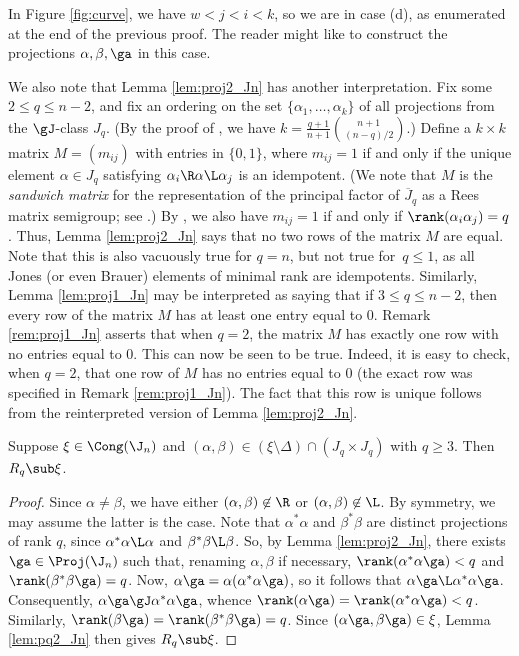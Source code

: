 %
\begin{rem}
In Figure \ref{fig:curve}, we have $w<j<i<k$, so we are in case (d), as enumerated at the end of the previous proof.  The reader might like to construct the projections $\alpha,\beta,\ga$ in this case.
\end{rem}


\begin{rem}\label{rem:proj2_Jn}
We also note that Lemma \ref{lem:proj2_Jn} has another interpretation.
%
Fix some $2\leq q\leq n-2$, and fix an ordering on the set $\{\alpha_1,\ldots,\alpha_k\}$ of all projections from the $\gJ$-class $J_q$.  (By the proof of \cite[Theorem~9.5]{EG2017}, we have $k=\frac{q+1}{n+1}\binom{n+1}{(n-q)/2}$.)  Define a $k\times k$ matrix $M=(m_{ij})$ with entries in $\{0,1\}$, where $m_{ij}=1$ if and only if
the unique element $\alpha\in J_q$ satisfying $\alpha_i\R\alpha\L\alpha_j$ is an idempotent.
(We note that $M$ is the \emph{sandwich matrix} for the representation of the principal factor of $\overline{J}_q$ as a Rees matrix semigroup; see \cite[Section 3.2]{Howie}.)
By \cite[Lemma 2.3(ii)]{emojoka}, we also have $m_{ij}=1$ if and only if $\rank(\alpha_i\alpha_j)=q$.  Thus, Lemma \ref{lem:proj2_Jn} says that no two rows of the matrix $M$ are equal.  Note that this is also vacuously true for $q=n$, but not true for~$q\leq1$, as all Jones (or even Brauer) elements of minimal rank are idempotents.  Similarly, Lemma \ref{lem:proj1_Jn} may be interpreted as saying that if $3\leq q\leq n-2$, then every row of the matrix $M$ has at least one entry equal to $0$.  Remark \ref{rem:proj1_Jn} asserts that when $q=2$, the matrix $M$ has exactly one row with no entries equal to $0$.  This can now be seen to be true.  Indeed, it is easy to check, when $q=2$, that one row of $M$ has no entries equal to $0$ (the exact row was specified in Remark \ref{rem:proj1_Jn}).  The fact that this row is unique follows from the reinterpreted version of Lemma \ref{lem:proj2_Jn}.
\end{rem}




\begin{lemma}\label{lem:qq_Jn}
Suppose $\xi\in\Cong(\J_n)$ and $(\alpha,\beta)\in (\xi\setminus\Delta)\cap (J_q\times J_q)$ with $q\geq3$.  Then $R_q\sub\xi$.
\end{lemma}


\begin{proof} Since $\alpha\not=\beta$, we have either $(\alpha,\beta)\not\in{\R}$ or $(\alpha,\beta)\not\in{\L}$.  By symmetry, we may assume the latter is the case.  Note that $\alpha^*\alpha$ and $\beta^*\beta$ are distinct projections of rank $q$, since $\alpha^*\alpha\L\alpha$ and $\beta^*\beta\L\beta$.  So, by Lemma \ref{lem:proj2_Jn}, there exists $\ga\in\Proj(\J_n)$ such that, renaming $\alpha,\beta$ if necessary, $\rank(\alpha^*\alpha\ga)<q$ and $\rank(\beta^*\beta\ga)=q$.  Now, $\alpha\ga=\alpha(\alpha^*\alpha\ga)$, so it follows that $\alpha\ga\L\alpha^*\alpha\ga$.  Consequently, $\alpha\ga\gJ\alpha^*\alpha\ga$, whence ${\rank(\alpha\ga)=\rank(\alpha^*\alpha\ga)<q}$.  Similarly, $\rank(\beta\ga)=\rank(\beta^*\beta\ga)=q$.  Since $(\alpha\ga,\beta\ga)\in\xi$, Lemma \ref{lem:pq2_Jn} then gives $R_q\sub\xi$. \end{proof}


